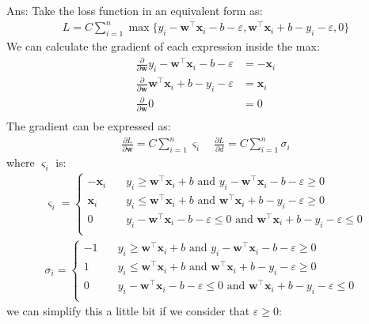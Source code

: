 \documentclass[10pt,letter,notitlepage]{article}
\newcommand{\wv}{\mathbf{w}}
\newcommand{\xv}{\mathbf{x}}
\newcommand{\ans}[1]{{\color{orange}\textsf{Ans}: #1}}
\newcounter{exercise}
\begin{document}
\begin{exercise}
\begin{enumerate}
	
\ans{
  Take the loss function in an equivalent form as:
  \begin{align*}
    L = C\sum_{i=1}^n \max\{y_i - \wv^\top \xv_i - b - \varepsilon, \wv^\top \xv_i + b - y_i -\varepsilon , 0 \}
  \end{align*}
  \color{orange}
  We can calculate the gradient of each expression inside the max:
  \begin{align*}
    \frac{\partial}{\partial{\wv}} y_i - \wv^\top \xv_i - b - \varepsilon &= -\xv_i \\
    \frac{\partial}{\partial{\wv}} \wv^\top \xv_i + b - y_i - \varepsilon &= \xv_i \\
    \frac{\partial}{\partial{\wv}} 0 &= 0 \\
  \end{align*}
  The gradient can be expressed as:
  \begin{align*}
    \frac{\partial{L}}{\partial{\wv}} = C\sum_{i=1}^n \varsigma_i \quad
    \frac{\partial{L}}{\partial{d}} = C\sum_{i=1}^n \sigma_i
  \end{align*}
  where $\varsigma_i$ is:
  \begin{align*}
    \varsigma_i = \left\{
        \begin{array}{ll}
            -\xv_i & \quad y_i \ge \wv^\top \xv_i + b \text{ and }  y_i - \wv^\top \xv_i - b - \varepsilon \ge 0 \\
            \xv_i & \quad  y_i \le \wv^\top \xv_i + b \text{ and }  \wv^\top \xv_i + b - y_i - \varepsilon \ge 0 \\
            0 & \quad y_i - \wv^\top \xv_i - b - \varepsilon \le 0 \text{ and }  \wv^\top \xv_i + b - y_i - \varepsilon \le 0\\
        \end{array}
    \right. \\
    \sigma_i = \left\{
        \begin{array}{ll}
            -1 & \quad y_i \ge \wv^\top \xv_i + b \text{ and }  y_i - \wv^\top \xv_i - b - \varepsilon \ge 0 \\
            1 & \quad  y_i \le \wv^\top \xv_i + b \text{ and }  \wv^\top \xv_i + b - y_i - \varepsilon \ge 0 \\
            0 & \quad y_i - \wv^\top \xv_i - b - \varepsilon \le 0 \text{ and }  \wv^\top \xv_i + b - y_i - \varepsilon \le 0\\
        \end{array}
    \right.
  \end{align*}
  we can simplify this a little bit if we consider that $\varepsilon \ge 0$:
}
\end{enumerate}
\end{exercise}
\end{document}
